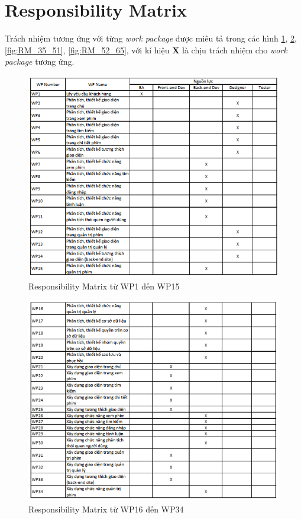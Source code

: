 \documentclass[a4paper]{book}
\begin{document}
\section{Responsibility Matrix}
Trách nhiệm tương ứng với từng \textit{work package} được miêu tả trong các hình \ref{fig:RM_1_15}, \ref{fig:RM_16_34}, \ref{fig:RM_35_51}, \ref{fig:RM_52_65}, với kí hiệu \textbf{X} là chịu trách nhiệm cho \textit{work package} tương ứng.
\begin{figure}
	\centering
	\includegraphics[width=0.7\textheight]{RM_1_15.png}
	\caption{Responsibility Matrix từ WP1 đến WP15}
	\label{fig:RM_1_15}
\end{figure}
\begin{figure}
	\centering
	\includegraphics[width=0.7\textheight]{RM_16_34.png}
	\caption{Responsibility Matrix từ WP16 đến WP34}
	\label{fig:RM_16_34}
\end{figure}
\end{document}
